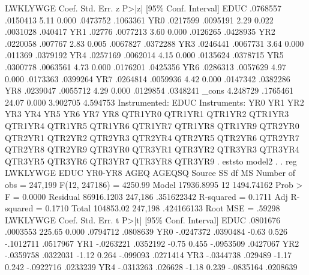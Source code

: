 {\smallskip}
    LWKLYWGE {\VBAR}      Coef.   Std. Err.      z    P>|z|     [95\% Conf. Interval]
        EDUC {\VBAR}   .0768557   .0150413     5.11   0.000     .0473752    .1063361
         YR0 {\VBAR}   .0217599   .0095191     2.29   0.022     .0031028     .040417
         YR1 {\VBAR}     .02776   .0077213     3.60   0.000     .0126265    .0428935
         YR2 {\VBAR}   .0220058    .007767     2.83   0.005     .0067827    .0372288
         YR3 {\VBAR}   .0246441   .0067731     3.64   0.000      .011369    .0379192
         YR4 {\VBAR}   .0257169   .0062014     4.15   0.000     .0135624    .0378715
         YR5 {\VBAR}   .0300778   .0063561     4.73   0.000     .0176201    .0425356
         YR6 {\VBAR}   .0286313   .0057629     4.97   0.000     .0173363    .0399264
         YR7 {\VBAR}   .0264814   .0059936     4.42   0.000     .0147342    .0382286
         YR8 {\VBAR}   .0239047   .0055712     4.29   0.000     .0129854    .0348241
       _cons {\VBAR}   4.248729   .1765461    24.07   0.000     3.902705    4.594753
Instrumented:  EDUC
Instruments:   YR0 YR1 YR2 YR3 YR4 YR5 YR6 YR7 YR8 QTR1YR0 QTR1YR1 QTR1YR2
               QTR1YR3 QTR1YR4 QTR1YR5 QTR1YR6 QTR1YR7 QTR1YR8 QTR1YR9
               QTR2YR0 QTR2YR1 QTR2YR2 QTR2YR3 QTR2YR4 QTR2YR5 QTR2YR6
               QTR2YR7 QTR2YR8 QTR2YR9 QTR3YR0 QTR3YR1 QTR3YR2 QTR3YR3
               QTR3YR4 QTR3YR5 QTR3YR6 QTR3YR7 QTR3YR8 QTR3YR9
{\smallskip}
. eststo model2
{\smallskip}
. 
. reg  LWKLYWGE EDUC  YR0-YR8 AGEQ AGEQSQ 
{\smallskip}
      Source {\VBAR}       SS           df       MS      Number of obs   =   247,199
   F(12, 247186)   =   4250.99
       Model {\VBAR}  17936.8995        12  1494.74162   Prob > F        =    0.0000
    Residual {\VBAR}  86916.1203   247,186  .351622342   R-squared       =    0.1711
   Adj R-squared   =    0.1710
       Total {\VBAR}   104853.02   247,198  .424166133   Root MSE        =    .59298
{\smallskip}
    LWKLYWGE {\VBAR}      Coef.   Std. Err.      t    P>|t|     [95\% Conf. Interval]
        EDUC {\VBAR}   .0801676   .0003553   225.65   0.000     .0794712    .0808639
         YR0 {\VBAR}  -.0247372   .0390484    -0.63   0.526    -.1012711    .0517967
         YR1 {\VBAR}  -.0263221   .0352192    -0.75   0.455    -.0953509    .0427067
         YR2 {\VBAR}  -.0359758   .0322031    -1.12   0.264     -.099093    .0271414
         YR3 {\VBAR}  -.0344738    .029489    -1.17   0.242    -.0922716    .0233239
         YR4 {\VBAR}  -.0313263    .026628    -1.18   0.239    -.0835164    .0208639
